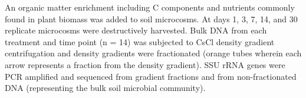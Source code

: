 An organic matter enrichment including C components and nutrients commonly found
in plant biomass was added to soil microcosms. At days
1, 3, 7, 14, and 30 replicate microcosms were destructively harvested. 
Bulk DNA from each treatment and time point
(n = 14) was subjected to CsCl density gradient centrifugation and density gradients
were fractionated (orange tubes wherein each arrow represents a fraction from the density gradient).
SSU rRNA genes were PCR amplified and sequenced from gradient fractions and
from non-fractionated DNA (representing the bulk soil microbial community).

